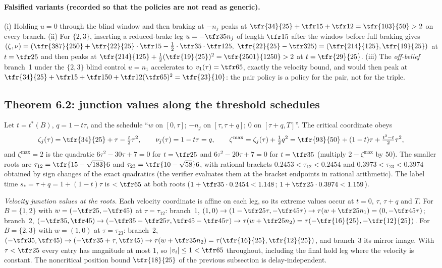 \paragraph{Falsified variants (recorded so that the policies are not read as generic).}
(i) Holding $u=0$ through the blind window and then braking at $-n_j$ peaks at $\tfr{34}{25}+\tfr15+\tfr12=\tfr{103}{50}>2$ on every branch. (ii) For $\{2,3\}$, inserting a reduced-brake leg $u=-\tfr35n_j$ of length $\tfr15$ after the window before full braking gives $(\zeta,\nu)=(\tfr{387}{250}+\tfr{22}{25}\cdot\tfr15-\tfrac12\cdot\tfr35\cdot\tfr1{25},\ \tfr{22}{25}-\tfr3{25})=(\tfr{214}{125},\tfr{19}{25})$ at $t=\tfr25$ and then peaks at $\tfr{214}{125}+\tfrac12(\tfr{19}{25})^2=\tfr{2501}{1250}>2$ at $t=\tfr{29}{25}$. (iii) The \emph{off-belief} branch~1 under the $\{2,3\}$ blind control $u=n_1$ accelerates to $v_1(\tau)=\tfr65$, exactly the velocity bound, and would then peak at $\tfr{34}{25}+\tfr15+\tfr1{50}+\tfr12(\tfr65)^2=\tfr{23}{10}$: the pair policy is a policy for the pair, not for the triple.

\subsection{Theorem 6.2: junction values along the threshold schedules}

Let $t=t^\ast(B)$, $q=1-t\tau$, and the schedule ``$w$ on $[0,\tau]$; $-n_j$ on $[\tau,\tau+q]$; $0$ on $[\tau+q,T]$''. The critical coordinate obeys
\[
\zeta_j(\tau)=\tfr{34}{25}+\tau-\tfrac t2\tau^2,\qquad\nu_j(\tau)=1-t\tau=q,\qquad\zeta^{\max}=\zeta_j(\tau)+\tfrac12q^2=\tfr{93}{50}+(1-t)\tau+\tfrac{t^2-t}2\tau^2 ,
\]
and $\zeta^{\max}=2$ is the quadratic $6\tau^2-30\tau+7=0$ for $t=\tfr25$ and $6\tau^2-20\tau+7=0$ for $t=\tfr35$ (multiply $2-\zeta^{\max}$ by $50$). The smaller roots are $\tau_{12}=\tfr{15-\sqrt{183}}6$ and $\tau_{23}=\tfr{10-\sqrt{58}}6$, with rational brackets $0.2453<\tau_{12}<0.2454$ and $0.3973<\tau_{23}<0.3974$ obtained by sign changes of the exact quadratics (the verifier evaluates them at the bracket endpoints in rational arithmetic). The label time $s_\ast=\tau+q=1+(1-t)\tau$ is $<\tfr65$ at both roots ($1+\tfr35\cdot0.2454<1.148$; $1+\tfr25\cdot0.3974<1.159$).

\emph{Velocity junction values at the roots.} Each velocity coordinate is affine on each leg, so its extreme values occur at $t=0$, $\tau$, $\tau+q$ and $T$. For $B=\{1,2\}$ with $w=(-\tfr25,-\tfr45)$ at $\tau=\tau_{12}$: branch~1, $(1,0)\to(1-\tfr25\tau,-\tfr45\tau)\to\tau(w+\tfr25n_1)=(0,-\tfr45\tau)$; branch~2, $(-\tfr35,\tfr45)\to(-\tfr35-\tfr25\tau,\tfr45-\tfr45\tau)\to\tau(w+\tfr25n_2)=\tau(-\tfr{16}{25},-\tfr{12}{25})$. For $B=\{2,3\}$ with $w=(1,0)$ at $\tau=\tau_{23}$: branch~2, $(-\tfr35,\tfr45)\to(-\tfr35+\tau,\tfr45)\to\tau(w+\tfr35n_2)=\tau(\tfr{16}{25},\tfr{12}{25})$, and branch~3 its mirror image. With $\tau<\tfr25$ every entry has magnitude at most $1$, so $|v_i|\le1<\tfr65$ throughout, including the final hold leg where the velocity is constant. The noncritical position bound $\tfr{18}{25}$ of the previous subsection is delay-independent.

